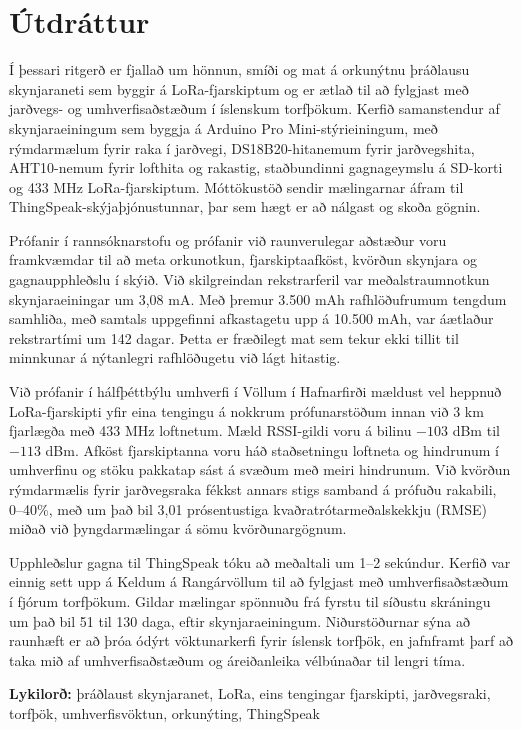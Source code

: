 \chapter*{Útdráttur}
Í þessari ritgerð er fjallað um hönnun, smíði og mat á orkunýtnu þráðlausu skynjaraneti sem byggir á LoRa-fjarskiptum og er ætlað til að fylgjast með jarðvegs- og umhverfisaðstæðum í íslenskum torfþökum. Kerfið samanstendur af skynjaraeiningum sem byggja á Arduino Pro Mini-stýrieiningum, með rýmdarmælum fyrir raka í jarðvegi, DS18B20-hitanemum fyrir jarðvegshita, AHT10-nemum fyrir lofthita og rakastig, staðbundinni gagnageymslu á SD-korti og 433 MHz LoRa-fjarskiptum. Móttökustöð sendir mælingarnar áfram til ThingSpeak-skýjaþjónustunnar, þar sem hægt er að nálgast og skoða gögnin.

Prófanir í rannsóknarstofu og prófanir við raunverulegar aðstæður voru framkvæmdar til að meta orkunotkun, fjarskiptaafköst, kvörðun skynjara og gagnaupphleðslu í skýið. Við skilgreindan rekstrarferil var meðalstraumnotkun skynjaraeiningar um 3,08 mA. Með þremur 3.500 mAh rafhlöðufrumum tengdum samhliða, með samtals uppgefinni afkastagetu upp á 10.500 mAh, var áætlaður rekstrartími um 142 dagar. Þetta er fræðilegt mat sem tekur ekki tillit til minnkunar á nýtanlegri rafhlöðugetu við lágt hitastig.

Við prófanir í hálfþéttbýlu umhverfi í Völlum í Hafnarfirði mældust vel heppnuð LoRa-fjarskipti yfir eina tengingu á nokkrum prófunarstöðum innan við 3 km fjarlægða með 433 MHz loftnetum. Mæld RSSI-gildi voru á bilinu $-103$ dBm til $-113$ dBm. Afköst fjarskiptanna voru háð staðsetningu loftneta og hindrunum í umhverfinu og stöku pakkatap sást á svæðum með meiri hindrunum. Við kvörðun rýmdarmælis fyrir jarðvegsraka fékkst annars stigs samband á prófuðu rakabili, 0--40\%, með um það bil 3,01 prósentustiga kvaðratrótarmeðalskekkju (RMSE) miðað við þyngdarmælingar á sömu kvörðunargögnum.

Upphleðslur gagna til ThingSpeak tóku að meðaltali um 1--2 sekúndur. Kerfið var einnig sett upp á Keldum á Rangárvöllum til að fylgjast með umhverfisaðstæðum í fjórum torfþökum. Gildar mælingar spönnuðu frá fyrstu til síðustu skráningu um það bil 51 til 130 daga, eftir skynjaraeiningum. Niðurstöðurnar sýna að raunhæft er að þróa ódýrt vöktunarkerfi fyrir íslensk torfþök, en jafnframt þarf að taka mið af umhverfisaðstæðum og áreiðanleika vélbúnaðar til lengri tíma.

\vfill
\textbf{Lykilorð:} þráðlaust skynjaranet, LoRa, eins tengingar fjarskipti, jarðvegsraki, torfþök, umhverfisvöktun, orkunýting, ThingSpeak

